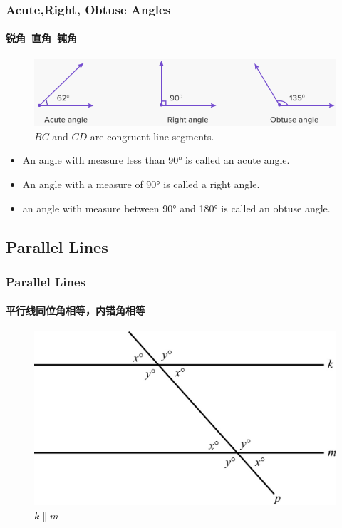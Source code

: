 \documentclass[
	11pt, %
]{beamer}
\begin{document}
\begin{frame}
	\frametitle{Acute,Right, Obtuse Angles} %
	\framesubtitle{锐角\ 直角\ 钝角}

		\begin{figure}
			\includegraphics[width=\linewidth]{Acute_Right_Obtuse.png}
			\caption{$BC$ and $CD$ are congruent line segments.}
		\end{figure}

		\begin{definition}
		\begin{itemize}
			\item An angle with measure less than 90° is called an \alert{acute angle}.
			\item An angle with a measure of 90° is called a \alert{right angle}.
			\item an angle with measure between 90° and 180° is called an \alert{obtuse angle}.
		\end{itemize}
		\end{definition}
\end{frame}


\subsection{Parallel Lines}


\begin{frame}
	\frametitle{Parallel Lines} %
	\framesubtitle{平行线同位角相等，内错角相等}
		\begin{figure}
			\includegraphics[width=0.9\linewidth]{Parallel_Lines.jpg}
			\caption{$k \parallel m$}
		\end{figure}
\end{frame}
\end{document}
